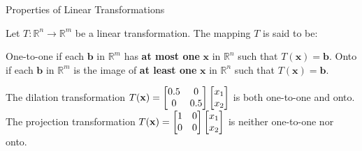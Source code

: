 \documentclass[xcolor=dvipsnames,aspectratio=169,t]{beamer}
\begin{document}
\begin{frame}{Properties of Linear Transformations}

\bbox
Let $T: \mathbb{R}^n \to \mathbb{R}^m$ be a linear transformation. The mapping $T$ is said to be:

\bi
\ii  \alert{One-to-one} if each $\mathbf{b}$ in $\mathbb{R}^m$ has \textbf{at most one} $\mathbf{x}$ in $\mathbb{R}^n$ such that $T( \mathbf{x}) = \mathbf{b}$.
\ii \alert{Onto} if each $\mathbf{b}$ in $\mathbb{R}^m$ is the image of \textbf{at least one} $\mathbf{x}$ in $\mathbb{R}^n$ such that $T( \mathbf{x}) = \mathbf{b}$.
\ei

\ebox

  \pause
  \begin{example}
  \bi 
  \ii The dilation transformation $\displaystyle T(\mathbf{x}) =  \begin{bmatrix}  0.5 & 0 \\ 0 & 0.5 \end{bmatrix} \begin{bmatrix} x_1 \\ x_2 \end{bmatrix}$ is both one-to-one and onto.
  \medskip
  \ii The projection transformation $\displaystyle T(\mathbf{x}) =  \begin{bmatrix}  1 & 0 \\ 0 & 0 \end{bmatrix} \begin{bmatrix} x_1 \\ x_2 \end{bmatrix}$ is neither one-to-one nor onto.
  \ei
  \end{example}

\end{frame}
\end{document}
